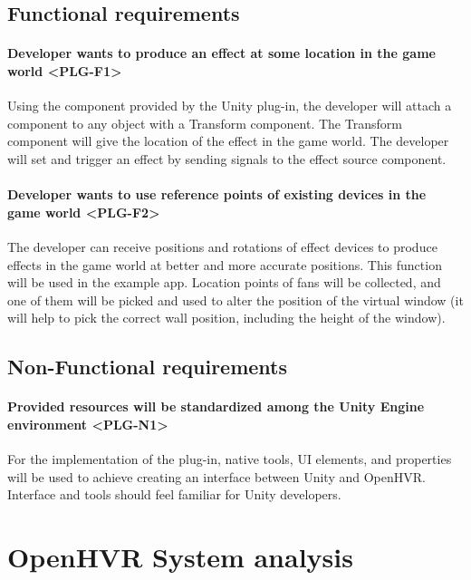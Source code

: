 \pagebreak

\subsection{Functional requirements}

\paragraph*{Developer wants to produce an effect at some location in the game world <PLG-F1>}
\label{plg-f1}
Using the component provided by the Unity plug-in, the developer will attach
a component to any object with a Transform component. The Transform component
will give the location of the effect in the game world. The developer will
set and trigger an effect by sending signals to the effect source component.

\paragraph*{Developer wants to use reference points of existing devices in the game world <PLG-F2>}
\label{plg-f2}
The developer can receive
positions and rotations of effect devices to produce effects in the
game world at better and more accurate positions.
This function will be used in the example app. Location points of
fans will be collected, and one of them will be picked and used to alter
the position of the virtual window (it will help to pick the correct wall position,
including the height of the window).

\subsection{Non-Functional requirements}

\paragraph*{Provided resources will be standardized among the Unity Engine environment <PLG-N1>}
\label{plg-n1}
For the implementation of the plug-in, native tools, UI elements, and properties
will be used to achieve creating an interface between Unity and OpenHVR.
Interface and tools should feel familiar for Unity developers.


\section{OpenHVR System analysis}

